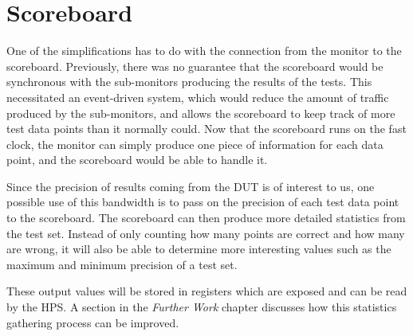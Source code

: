 \section{Scoreboard}
One of the simplifications has to do with the connection from the monitor to the scoreboard.
Previously, there was no guarantee that the scoreboard would be synchronous with the sub-monitors producing the results of the tests.
This necessitated an event-driven system, which would reduce the amount of traffic produced by the sub-monitors, and allows the scoreboard to keep track of more test data points than it normally could.
Now that the scoreboard runs on the fast clock, the monitor can simply produce one piece of information for each data point, and the scoreboard would be able to handle it.

Since the precision of results coming from the DUT is of interest to us, one possible use of this bandwidth is to pass on the precision of each test data point to the scoreboard.
The scoreboard can then produce more detailed statistics from the test set.
Instead of only counting how many points are correct and how many are wrong, it will also be able to determine more interesting values such as the maximum and minimum precision of a test set.

These output values will be stored in registers which are exposed and can be read by the HPS.
A section in the \textit{Further Work} chapter discusses how this statistics gathering process can be improved.
